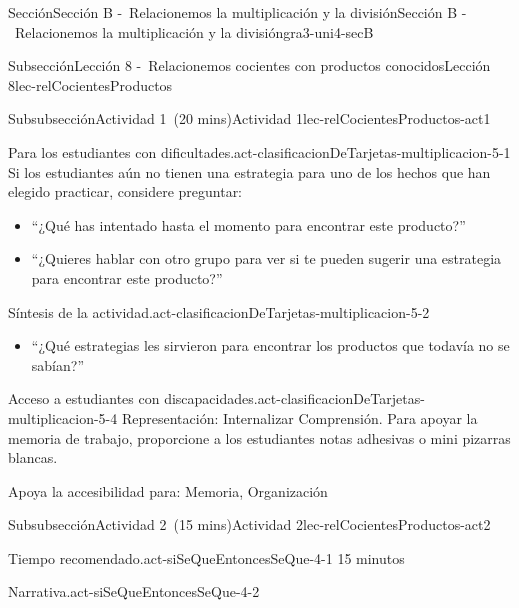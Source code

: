 \documentclass[oneside,10pt,]{article}
\newlength{\fillinmaxwidth}
\newlength{\fillincontract}
\newlength{\charmaxwidth}\setlength{\charmaxwidth}{0.5em}
\newlength{\charminwidth}\setlength{\charminwidth}{0.1em}
\newlength{\fillinheight}
\newcommand{\fillintext}[1]{%
\setlength{\fillinmaxwidth}{#1\charmaxwidth}%
\setlength{\fillincontract}{#1\charminwidth}%
\setlength{\fillinheight}{\baselineskip}\addtolength{\fillinheight}{1.2pt}%
\strut\nobreak\leaders\vbox{\hrule width 0.3pt height 0.3pt \vskip -1.2pt}\hskip 1\fillinmaxwidth minus \fillincontract\nobreak\strut%
}
\begin{document}
\begin{sectionptx}{Sección}{Sección B -~Relacionemos la multiplicación y la división}{}{Sección B -~Relacionemos la multiplicación y la división}{}{}{gra3-uni4-secB}
\begin{subsectionptx}{Subsección}{Lección 8 -~Relacionemos cocientes con productos conocidos}{}{Lección 8}{}{}{lec-relCocientesProductos}
\begin{subsubsectionptx}{Subsubsección}{Actividad 1~(20 mins)}{}{Actividad 1}{}{}{lec-relCocientesProductos-act1}
\begin{paragraphs}{Para los estudiantes con dificultades.}{act-clasificacionDeTarjetas-multiplicacion-5-1}
Si los estudiantes aún no tienen una estrategia para uno de los hechos que han elegido practicar, considere preguntar:%
%
\begin{itemize}[label=\textbullet]
\item{}``¿Qué has intentado hasta el momento para encontrar este producto?''%
\item{}``¿Quieres hablar con otro grupo para ver si te pueden sugerir una estrategia para encontrar este producto?''%
\end{itemize}
\end{paragraphs}%
\begin{paragraphs}{Síntesis de la actividad.}{act-clasificacionDeTarjetas-multiplicacion-5-2}%
%
\begin{itemize}[label=\textbullet]
\item{}``¿Qué estrategias les sirvieron para encontrar los productos que todavía no se sabían?''%
\end{itemize}
\end{paragraphs}%
%
\begin{paragraphs}{Acceso a estudiantes con discapacidades.}{act-clasificacionDeTarjetas-multiplicacion-5-4}%
Representación: Internalizar Comprensión. Para apoyar la memoria de trabajo, proporcione a los estudiantes notas adhesivas o mini pizarras blancas.%
\par
Apoya la accesibilidad para: Memoria, Organización%
\end{paragraphs}%
\end{subsubsectionptx}
%
%
\typeout{************************************************}
\typeout{************************************************}
%
\begin{subsubsectionptx}{Subsubsección}{Actividad 2~(15 mins)}{}{Actividad 2}{}{}{lec-relCocientesProductos-act2}
\par
\begin{paragraphs}{Tiempo recomendado.}{act-siSeQueEntoncesSeQue-4-1}%
15 minutos%
\end{paragraphs}%
\begin{paragraphs}{Narrativa.}{act-siSeQueEntoncesSeQue-4-2}%

\end{paragraphs}
\end{subsubsectionptx}
\end{subsectionptx}
\end{sectionptx}
\end{document}
